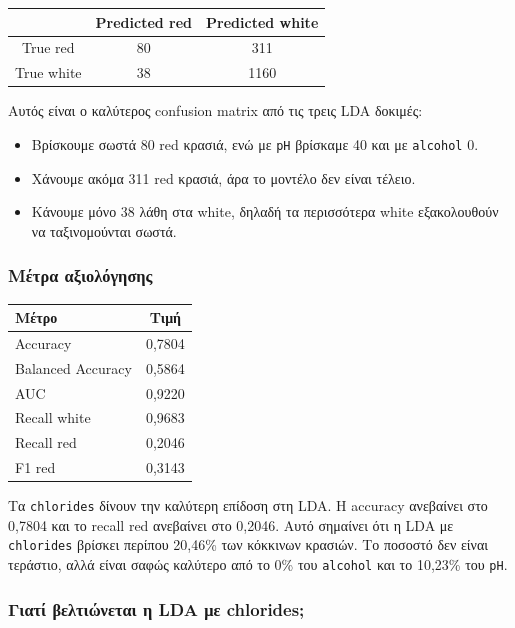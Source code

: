 \documentclass[11pt,a4paper]{article}
\newcommand{\code}[1]{\texttt{#1}}
\begin{document}
\begin{center}
\begin{tabular}{c|cc}
\toprule
 & Predicted red & Predicted white \\
\midrule
True red & 80 & 311 \\
True white & 38 & 1160 \\
\bottomrule
\end{tabular}
\end{center}

Αυτός είναι ο καλύτερος confusion matrix από τις τρεις LDA δοκιμές:
\begin{itemize}
    \item Βρίσκουμε σωστά 80 red κρασιά, ενώ με \code{pH} βρίσκαμε 40 και με
    \code{alcohol} 0.
    \item Χάνουμε ακόμα 311 red κρασιά, άρα το μοντέλο δεν είναι τέλειο.
    \item Κάνουμε μόνο 38 λάθη στα white, δηλαδή τα περισσότερα white
    εξακολουθούν να ταξινομούνται σωστά.
\end{itemize}

\subsubsection{Μέτρα αξιολόγησης}

\begin{center}
\begin{tabular}{lc}
\toprule
Μέτρο & Τιμή \\
\midrule
Accuracy & 0,7804 \\
Balanced Accuracy & 0,5864 \\
AUC & 0,9220 \\
Recall white & 0,9683 \\
Recall red & 0,2046 \\
F1 red & 0,3143 \\
\bottomrule
\end{tabular}
\end{center}

Τα \code{chlorides} δίνουν την καλύτερη επίδοση στη LDA. Η accuracy ανεβαίνει
στο 0,7804 και το recall red ανεβαίνει στο 0,2046. Αυτό σημαίνει ότι η LDA
με \code{chlorides} βρίσκει περίπου 20,46\% των κόκκινων κρασιών. Το ποσοστό
δεν είναι τεράστιο, αλλά είναι σαφώς καλύτερο από το 0\% του \code{alcohol}
και το 10,23\% του \code{pH}.

\subsubsection{Γιατί βελτιώνεται η LDA με chlorides;}
\end{document}
